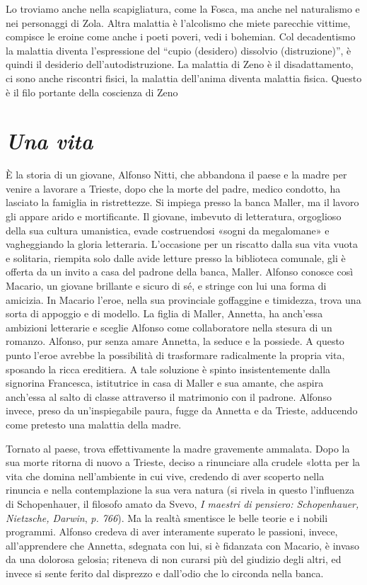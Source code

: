 Lo troviamo anche nella scapigliatura, come la Fosca, ma anche nel naturalismo e nei personaggi di Zola. Altra malattia è l’alcolismo che miete parecchie vittime, compisce le eroine come anche i poeti poveri, vedi i bohemian. 
Col decadentismo la malattia diventa l’espressione del “cupio (desidero) dissolvio (distruzione)”, è quindi il desiderio dell’autodistruzione. 
La malattia di Zeno è il disadattamento, ci sono anche riscontri fisici, la malattia dell’anima diventa malattia fisica. Questo è il filo portante della coscienza di Zeno


\chapter{\textit{Una vita}}

È la storia di un giovane, Alfonso Nitti, che abbandona il paese e la madre per venire a lavorare a Trieste, dopo che la morte del padre, medico condotto, ha lasciato la famiglia in ristrettezze. Si impiega presso la banca Maller, ma il lavoro gli appare arido e mortificante. Il giovane, imbevuto di letteratura, orgoglioso della sua cultura umanistica, evade costruendosi «sogni da megalomane» e vagheggiando la gloria letteraria.
L'occasione per un riscatto dalla sua vita vuota e solitaria, riempita solo dalle avide letture presso la biblioteca comunale, gli è offerta da un invito a casa del padrone della banca, Maller. Alfonso conosce così Macario, un giovane brillante e sicuro di sé, e stringe con lui una forma di amicizia. In Macario l'eroe, nella sua provinciale goffaggine e timidezza, trova una sorta di appoggio e di modello. La figlia di Maller, Annetta, ha anch'essa ambizioni letterarie e sceglie Alfonso come collaboratore nella stesura di un romanzo. Alfonso, pur senza amare Annetta, la seduce e la possiede. A questo punto l'eroe avrebbe la possibilità di trasformare radicalmente la propria vita, sposando la ricca ereditiera. A tale soluzione è spinto insistentemente dalla signorina Francesca, istitutrice in casa di Maller e sua amante, che aspira anch'essa al salto di classe attraverso il matrimonio con il padrone. Alfonso invece, preso da un'inspiegabile paura, fugge da Annetta e da Trieste, adducendo come pretesto una malattia della madre.

Tornato al paese, trova effettivamente la madre gravemente ammalata. Dopo la sua morte ritorna di nuovo a Trieste, deciso a rinunciare alla crudele «lotta per la vita che domina nell'ambiente in cui vive, credendo di aver scoperto nella rinuncia e nella contemplazione la sua vera natura (si rivela in questo l'influenza di Schopenhauer, il filosofo amato da Svevo, \textit{I maestri di pensiero: Schopenhauer, Nietzsche, Darwin}, \emph{p. 766}). Ma la realtà smentisce le belle teorie e i nobili programmi. Alfonso credeva di aver interamente superato le passioni, invece, all'apprendere che Annetta, sdegnata con lui, si è fidanzata con Macario, è invaso da una dolorosa gelosia; riteneva di non curarsi più del giudizio degli altri, ed invece si sente ferito dal disprezzo e dall'odio che lo circonda nella banca.

